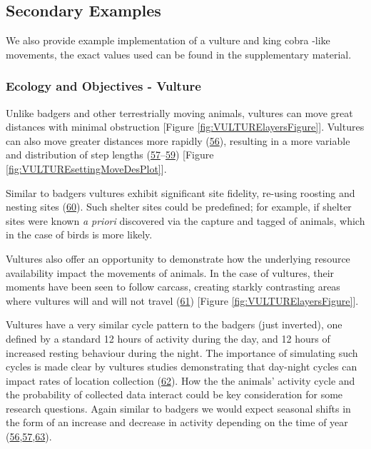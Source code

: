 \documentclass[10pt,a4paper]{article}
\begin{document}
\hypertarget{secondary-examples}{%
\subsection{Secondary Examples}\label{secondary-examples}}

We also provide example implementation of a vulture and king cobra -like movements, the exact values used can be found in the supplementary material.

\hypertarget{ecology-and-objectives---vulture}{%
\subsubsection{Ecology and Objectives - Vulture}\label{ecology-and-objectives---vulture}}

Unlike badgers and other terrestrially moving animals, vultures can move great distances with minimal obstruction {[}Figure \ref{fig:VULTURElayersFigure}{]}.
Vultures can also move greater distances more rapidly (\protect\hyperlink{ref-hribsek_first_2021}{56}), resulting in a more variable and distribution of step lengths (\protect\hyperlink{ref-garcia-jimenez_drivers_2018}{57}--\protect\hyperlink{ref-subedi_spatial_2020}{59}) {[}Figure \ref{fig:VULTUREsettingMoveDesPlot}{]}.

Similar to badgers vultures exhibit significant site fidelity, re-using roosting and nesting sites (\protect\hyperlink{ref-bracis_revisitation_2018}{60}).
Such shelter sites could be predefined; for example, if shelter sites were known \emph{a priori} discovered via the capture and tagged of animals, which in the case of birds is more likely.

Vultures also offer an opportunity to demonstrate how the underlying resource availability impact the movements of animals.
In the case of vultures, their moments have been seen to follow carcass, creating starkly contrasting areas where vultures will and will not travel (\protect\hyperlink{ref-arrondo_invisible_2018}{61}) {[}Figure \ref{fig:VULTURElayersFigure}{]}.

Vultures have a very similar cycle pattern to the badgers (just inverted), one defined by a standard 12 hours of activity during the day, and 12 hours of increased resting behaviour during the night.
The importance of simulating such cycles is made clear by vultures studies demonstrating that day-night cycles can impact rates of location collection (\protect\hyperlink{ref-silva_seasonal_2017}{62}).
How the the animals' activity cycle and the probability of collected data interact could be key consideration for some research questions.
Again similar to badgers we would expect seasonal shifts in the form of an increase and decrease in activity depending on the time of year (\protect\hyperlink{ref-hribsek_first_2021}{56},\protect\hyperlink{ref-garcia-jimenez_drivers_2018}{57},\protect\hyperlink{ref-peshev_new_2021}{63}).
\end{document}
